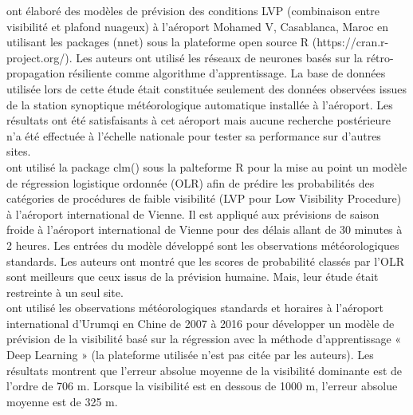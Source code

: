\cite{bari2015lvp} ont élaboré des modèles de prévision des conditions LVP (combinaison entre
visibilité et plafond nuageux) à l’aéroport Mohamed V, Casablanca, Maroc en utilisant les packages (nnet) sous la plateforme open source R (https://cran.r-project.org/). Les auteurs ont utilisé les
réseaux de neurones basés sur la rétro-propagation résiliente comme algorithme d’apprentissage. La
base de données utilisée lors de cette étude était constituée seulement des données observées issues de
la station synoptique météorologique automatique installée à l’aéroport. Les résultats ont été
satisfaisants à cet aéroport mais aucune recherche postérieure n’a été effectuée à l’échelle nationale
pour tester sa performance sur d’autres sites.\\


\cite{kneringer} ont utilisé la package clm() sous la palteforme R 
pour la mise au point un modèle de régression logistique ordonnée (OLR) afin de prédire les probabilités des catégories de procédures de faible visibilité (LVP pour Low Visibility Procedure) à 
l'aéroport international de Vienne. Il est appliqué aux prévisions de saison froide à l'aéroport international de Vienne pour des délais allant de 30 minutes à 2 heures. Les entrées du modèle développé sont les observations météorologiques standards. Les auteurs ont montré que les scores de probabilité classés par l'OLR sont meilleurs que ceux issus de la prévision humaine. Mais, leur étude était restreinte à un seul site.\\


\cite{zhu} ont utilisé les observations météorologiques standards et horaires à l'aéroport
international d'Urumqi en Chine de 2007 à 2016 pour développer un modèle de prévision de la visibilité
basé sur la régression avec la méthode d'apprentissage « Deep Learning » (la plateforme utilisée n'est pas citée par les auteurs). Les résultats montrent que
l'erreur absolue moyenne de la visibilité dominante est de l’ordre de 706 m. Lorsque la visibilité est en dessous de 1000 m, l'erreur absolue moyenne est de 325 m.\\


